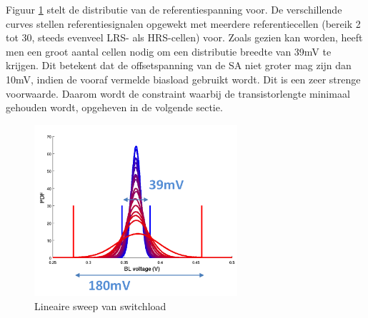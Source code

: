 Figuur \ref{fig:distref} stelt de distributie van de referentiespanning voor. De verschillende curves stellen referentiesignalen opgewekt met meerdere referentiecellen (bereik 2 tot 30, steeds evenveel LRS- als HRS-cellen) voor. Zoals gezien kan worden, heeft men een groot aantal cellen nodig om een distributie breedte van 39mV te krijgen. Dit betekent dat de offsetspanning van de SA niet groter mag zijn dan 10mV, indien de vooraf vermelde biasload gebruikt wordt. Dit is een zeer strenge voorwaarde. Daarom wordt de constraint waarbij de transistorlengte minimaal gehouden wordt, opgeheven in de volgende sectie.

\begin{figure}[!ht]
  \centering
  \includegraphics[width=0.67\textwidth]{../fig/hfdst-last-ref.png}
  \caption{Lineaire sweep van switchload}
  \label{fig:distref}
\end{figure}


